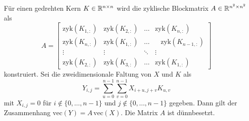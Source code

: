 \begin{lem}
    Für einen gedrehten Kern $K \in \mathbb{R}^{n \times n}$ wird die zyklische Blockmatrix $A \in \mathbb{R}^{n^2 \times n^2}$ als
    \begin{equation*}
        A=\begin{bmatrix}
            \mathrm{zyk}(K_{1,:}) &\mathrm{zyk}(K_{2,:}) &\ldots &\mathrm{zyk}(K_{n,:}) \\
            \mathrm{zyk}(K_{n,:}) &\mathrm{zyk}(K_{1,:}) &\ldots & \; \; \;\mathrm{zyk}(K_{n-1,:})\\
            \vdots &\vdots &\ddots &\vdots\\
            \mathrm{zyk}(K_{2,:}) &\mathrm{zyk}(K_{3,:}) &\ldots &\mathrm{zyk}(K_{1,:})
        \end{bmatrix}
    \end{equation*}
    konstruiert. Sei die zweidimensionale Faltung  von $X$ und $K$ als
    \begin{equation*}
        Y_{i,j}= \sum_{u=0}^{n-1} \sum _{v=0}^{n-1} X_{i+u,j+v} K_{u,v} 
    \end{equation*}
    mit $X_{i,j}=0$ für $i \notin\{0,\ldots, n-1\}$ und $j \notin \{0, \ldots, n-1\}$ gegeben. Dann gilt der Zusammenhang
    $\mathrm{vec}(Y)=A \, \mathrm{vec}(X)$. Die Matrix $A$ ist dünnbesetzt. 
\end{lem}

